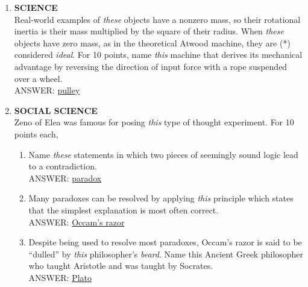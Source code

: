 \documentclass{report}
\newcommand*{\backtrack}{\setcounter{enumi}{\numexpr\theenumi-1\relax}}
\begin{document}
\begin{enumerate}
    \item \textbf{SCIENCE} \\ Real-world examples of \textit{these} objects have a nonzero mass, so their rotational inertia is their mass multiplied by the square of their radius. When \textit{these} objects have zero mass, as in the theoretical Atwood machine, they are (*) considered \textit{ideal}. For 10 points, name \textit{this} machine that derives its mechanical advantage by reversing the direction of input force with a rope suspended over a wheel. \\ ANSWER: \underline{pulley} \backtrack
    \item \textbf{SOCIAL SCIENCE} \\ Zeno of Elea was famous for posing \textit{this} type of thought experiment. For 10 points each,
    \begin{enumerate}[label=\Alph*]
        \item Name \textit{these} statements in which two pieces of seemingly sound logic lead to a contradiction. \\ ANSWER: \underline{paradox}
        \item Many paradoxes can be resolved by applying \textit{this} principle which states that the simplest explanation is most often correct. \\ ANSWER: \underline{Occam's razor}
        \item Despite being used to resolve most paradoxes, Occam's razor is said to be ``dulled'' by \textit{this} philosopher's \textit{beard}. Name this Ancient Greek philosopher who taught Aristotle and was taught by Socrates. \\ ANSWER: \underline{Plato}
    \end{enumerate}


\end{enumerate}
\end{document}
